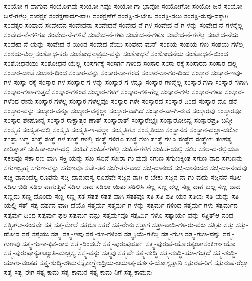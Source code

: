 {ಸಂಯೋ-ಗ-ವಾಗುವ
ಸಂಯೋಗವು
ಸಂಯೋ-ಗವೂ
ಸಂಯೋ-ಗಾ-ಭಾವೋ
ಸಂಯೋಗೋ
ಸಂಯೋ-ಜನೆ
ಸಂಯೋ-ಜನೆ-ಗಳೆಲ್ಲ
ಸಂರಕ್ಷಕ
ಸಂರಕ್ಷಣಾರ್ಥ-ವಾಗಿ
ಸಂರಕ್ಷಣೆಗೆ
ಸಂರಕ್ಷಿ-ಸ-ಬೇಕು
ಸಂರಕ್ಷಿ-ಸಲು
ಸಂರಕ್ಷಿ-ಸುವು-ದಕ್ಕಾಗಿ
ಸಂವತ್ಸರ
ಸಂವಾದ
ಸಂವೇದನ
ಸಂವೇದನಾ
ಸಂವೇದನೆ
ಸಂವೇದ-ನೆ-ಗಳ
ಸಂವೇದ-ನೆ-ಗ-ಳನ್ನು
ಸಂವೇದ-ನೆ-ಗಳನ್ನೆಲ್ಲ
ಸಂವೇದ-ನೆ-ಗಳಿಗೂ
ಸಂವೇದ-ನೆ-ಗಳಿವೆ
ಸಂವೇದ-ನೆ-ಗಳು
ಸಂವೇದ-ನೆ-ಗಳೂ
ಸಂವೇದ-ನೆ-ಗಳೆಲ್ಲ
ಸಂವೇದ-ನೆಯ
ಸಂವೇದ-ನೆ-ಯನ್ನು
ಸಂವೇದ-ನೆ-ಯಿಂದ
ಸಂವೇದ-ನೆಯು
ಸಂವೇದ-ಮನ್
ಸಂಶಯ
ಸಂಶಯ-ಗಳು
ಸಂಶಯ-ಗಳೆಲ್ಲ
ಸಂಶಯ-ವಿಲ್ಲ
ಸಂಶೋಧ-ಕರು
ಸಂಶೋಧನಾಕ್ರಮ-ವನ್ನು
ಸಂಶೋಧನೆ
ಸಂಶೋಧನೆಯ
ಸಂಶೋಧನೆ-ಯಿಂದ
ಸಂಶೋಧನೆಯು
ಸಂಶೋಧನೆ-ಯೆಲ್ಲ
ಸಂಸರ್ಗಕ್ಕೆ
ಸಂಸರ್ಗ-ಗಳಿಂದ
ಸಂಸಾರ
ಸಂಸಾ-ರಕ್ಕೆ
ಸಂಸಾರದ
ಸಂಸಾರ-ದಲ್ಲಿ
ಸಂಸಾರ-ದಾಚೆ
ಸಂಸಾರ-ದಿಂದ
ಸಂಸಾರ-ವನ್ನು
ಸಂಸಾರ-ಸಾ-ಗರದ
ಸಂಸಾರ-ಸಾ-ಗರ-ದಿಂದ
ಸಂಸ್ಕಾರ
ಸಂಸ್ಕಾರ-ಇವು-ಗಳ
ಸಂಸ್ಕಾ-ರಕ್ಕೆ
ಸಂಸ್ಕಾರ-ಗಳ
ಸಂಸ್ಕಾರ-ಗ-ಳನ್ನು
ಸಂಸ್ಕಾರ-ಗ-ಳನ್ನೂ
ಸಂಸ್ಕಾರ-ಗಳನ್ನೆಲ್ಲ
ಸಂಸ್ಕಾರ-ಗಳಾ
ಸಂಸ್ಕಾರ-ಗಳಾಗಿ
ಸಂಸ್ಕಾರ-ಗಳಾ-ಗುತ್ತದೆ
ಸಂಸ್ಕಾರ-ಗಳಿಂದ
ಸಂಸ್ಕಾರ-ಗಳಿಗೆ
ಸಂಸ್ಕಾರ-ಗಳಿ-ಗೆಲ್ಲ
ಸಂಸ್ಕಾರ-ಗಳು
ಸಂಸ್ಕಾರ-ಗಳೂ
ಸಂಸ್ಕಾರ-ಗಳೆಂದ-ರೇನು
ಸಂಸ್ಕಾರ-ಗಳೆಲ್ಲ
ಸಂಸ್ಕಾರ-ಗಳೆಲ್ಲವೂ
ಸಂಸ್ಕಾರ-ಗಳೇ
ಸಂಸ್ಕಾರದ
ಸಂಸ್ಕಾರ-ದಿಂದ
ಸಂಸ್ಕಾರ-ದೊ-ಡನೆ
ಸಂಸ್ಕಾರ-ವನ್ನು
ಸಂಸ್ಕಾರ-ವನ್ನೂ
ಸಂಸ್ಕಾರ-ವನ್ನೆಲ್ಲಾ
ಸಂಸ್ಕಾರ-ವಾಗಿದೆ
ಸಂಸ್ಕಾರ-ವಾ-ಗಿ-ರುವ
ಸಂಸ್ಕಾರವು
ಸಂಸ್ಕಾರವೂ
ಸಂಸ್ಕಾರ-ಶೇಷೋನ್ಯ
ಸಂಸ್ಕಾರ-ಸಾಕ್ಷಾತ್ಕರ-ಣಾತ್
ಸಂಸ್ಕಾರಾತ್
ಸಂಸ್ಕಾರೇಭ್ಯಃ
ಸಂಸ್ಕಾರೋಽನ್ಯ-ಸಂಸ್ಕಾರಪ್ರತಿ-ಬನ್ಧೀ
ಸಂಸ್ಕೃತ
ಸಂಸ್ಕೃತ-ದಲ್ಲಿ
ಸಂಸ್ಕೃತಿ
ಸಂಸ್ಕೃತಿ-ಇ-ವೆಲ್ಲಾ
ಸಂಸ್ಕೃತಿಗೂ
ಸಂಸ್ಕೃತಿಯು
ಸಂಸ್ಥಾನದ
ಸಂಸ್ಥಾನ-ದಲ್ಲಾ-ದರೋ
ಸಂಸ್ಥಾ-ಬದ್ಧ
ಸಂಸ್ಥೆ
ಸಂಸ್ಥೆ-ಗಳ
ಸಂಸ್ಥೆ-ಗಳಲ್ಲಿ
ಸಂಸ್ಥೆ-ಗಳಿಗೂ
ಸಂಸ್ಥೆ-ಗಳು
ಸಂಸ್ಥೆ-ಗಳೂ
ಸಂಸ್ಥೆಗೆ
ಸಂಸ್ಥೆಯ
ಸಂಹತ್ಯ-ಕಾರಿತ್ವಾತ್
ಸಂಹಿತಾ-ಭಾಗ-ದಲ್ಲಿ
ಸಂಹಿತೆ
ಸಂಹಿತೆ-ಗಳಲ್ಲಿ
ಸಂಹಿತೆ-ಗಳಿಗೆ
ಸಂಹಿತೆ-ಯಲ್ಲಿ
ಸಕಲ
ಸಕಲ-ದ-ರಲ್ಲಿಯೂ
ಸಕಲವೂ
ಸಕಾ-ರಣ-ವಾಗಿ
ಸಕ್ತಿ-ಯನ್ನು
ಸಖ
ಸಖನೆ
ಸಖರಾ-ಗು-ವುವು
ಸಗುಣ
ಸಗುಣಕ್ಕಿಂತ
ಸಗುಣ-ನಾದ
ಸಗುಣನು
ಸಗುಣಬ್ರಹ್ಮ
ಸಗುಣ-ವನ್ನು
ಸಗುಣವೂ
ಸಚೇ-ತನ
ಸಚೇ-ತನ-ವಾದ
ಸಚ್ಚಿ-ದಾನಂದ
ಸಚ್ಚಿ-ದಾನಂದದ
ಸಚ್ಚಿ-ದಾ-ನಂದವು
ಸಚ್ಚಿ-ದಾನಂದಸ್ವ-ರೂಪನು
ಸಚ್ಚಿ-ದಾನಂದಸ್ವ-ರೂಪವೇ
ಸಜ್ಜನ-ನಾಗಿ-ರ-ಬೇಕು
ಸಜ್ಜನ-ನಾ-ಗು-ವುದು
ಸಜ್ಜನನೆ
ಸಡಿಲ
ಸಡಿಲ-ಬಿಡಿ
ಸಡಿಲ-ವಾಗುತ್ತಿವೆ
ಸಡಿಲ-ವಾದ
ಸಡಿಲಾ-ಯಿತು
ಸಡಿಲಿಸಿ
ಸಣ್ಣ
ಸಣ್ಣ-ದಲ್ಲ
ಸಣ್ಣ-ದಾಗ-ಬಲ್ಲ
ಸಣ್ಣ-ದಾದ
ಸಣ್ಣದು
ಸಣ್ಣ-ದೊಂದು
ಸಣ್ಣ-ಸಣ್ಣ
ಸತ
ಸತತ
ಸತತ-ವಾಗಿ
ಸತತವೂ
ಸತಿ
ಸತಿ-ಪತಿ-ಯರ
ಸತಿಯ
ಸತಿ-ಯನ್ನು
ಸತಿ-ಯಲ್ಲಿ
ಸತ್
ಸತ್ಕ-ದರ್ಶನ-ವಾಗಿ-ದೆಯೊ
ಸತ್ಕರ್ಮ
ಸತ್ಕರ್ಮ-ಗ-ಳನ್ನು
ಸತ್ಕರ್ಮ-ಗಳಿಂದ
ಸತ್ಕರ್ಮ-ಗಳು
ಸತ್ಕರ್ಮದ
ಸತ್ಕರ್ಮ-ದಿಂದ
ಸತ್ಕರ್ಮ-ಫಲ
ಸತ್ಕರ್ಮ-ವನ್ನು
ಸತ್ಕರ್ಮವೂ
ಸತ್ಕರ್ಮಿ-ಗಳೊ
ಸತ್ಕಾರ್ಯ-ವನ್ನು
ಸತ್ಚಿತ್ಆ-ನಂದ
ಸತ್ಚಿತ್ಆ-ನಂದವೇ
ಸತ್ತ
ಸತ್ತ-ಮೇಲೆ
ಸತ್ತರೂ
ಸತ್ತರೆ
ಸತ್ತ-ರೇನು
ಸತ್ತಾಗ
ಸತ್ತಾ-ವಾದಿ-ಗಳಿ-ರು-ವರು
ಸತ್ತಿತು
ಸತ್ತು
ಸತ್ತು-ಹೋದ
ಸತ್ತೆ
ಸತ್ತೆಯು
ಸತ್ತ್ವ
ಸತ್ತ್ವ-ಇವು
ಸತ್ತ್ವ-ಕಣ-ಗಳಿಂದ
ಸತ್ತ್ವಕ್ರಿಯೆ-ಗಳೆಲ್ಲ
ಸತ್ತ್ವ-ಗುಣ
ಸತ್ತ್ವ-ಗುಣ-ವನ್ನು
ಸತ್ತ್ವ-ಗುಣವು
ಸತ್ತ್ವ-ಗುಣಾ-ಧಿಕ-ರಾದ
ಸತ್ತ್ವ-ದಿಂದಲೇ
ಸತ್ತ್ವ-ಪುರುಷಯೋಃ
ಸತ್ತ್ವ-ಪುರುಷ-ಯೋರತ್ಯಂತಾಸಂಕೀರ್ಣಯೋಃ
ಸತ್ತ್ವ-ಪುರುಷಾನ್ಯತಾಖ್ಯಾತಿ-ಮಾತ್ರಸ್ಯ
ಸತ್ತ್ವ-ವನ್ನು
ಸತ್ತ್ವವು
ಸತ್ತ್ವವೇ
ಸತ್ತ್ವ-ಶುದ್ಧಿ
ಸತ್ತ್ವ-ಶುದ್ಧಿ-ಯಾ-ಗುತ್ತದೆ
ಸತ್ತ್ವ-ಶುದ್ಧಿ-ಯಾಗು-ವಂತಹ
ಸತ್ತ್ವ-ಶುದ್ಧಿ-ಸೌಮನಸ್ಯೈಕಾಗ್ರ್ಯೇಂದ್ರಿಯ-ಜಯಾತ್ಮ-ದರ್ಶನ-ಯೋಗ್ಯತ್ವಾನಿ
ಸತ್ಪುರಷ-ರಿಗೆ
ಸತ್ಪುರುಷ-ರೆಲ್ಲಾ
ಸತ್ಯ
ಸತ್ಯ-ಈಗ
ಸತ್ಯ-ಕಾಮ
ಸತ್ಯ-ಕಾಮನ
ಸತ್ಯ-ಕಾಮ-ನಿಗೆ
ಸತ್ಯ-ಕಾಮನು
}
